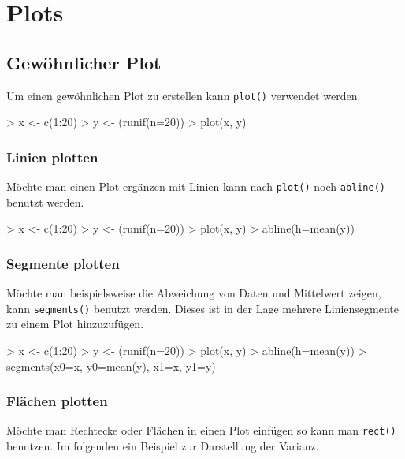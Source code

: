 \section{Plots}

\subsection{Gewöhnlicher Plot}
Um einen gewöhnlichen Plot zu erstellen kann \lstinline{plot()}
verwendet werden. 

\begin{Schunk}
\begin{Sinput}
> x <- c(1:20)
> y <- (runif(n=20))
> plot(x, y)
\end{Sinput}
\end{Schunk}

\subsubsection{Linien plotten}
Möchte man einen Plot ergänzen mit Linien kann nach \lstinline{plot()}
noch \lstinline{abline()} benutzt werden.

\begin{Schunk}
\begin{Sinput}
> x <- c(1:20)
> y <- (runif(n=20))
> plot(x, y)
> abline(h=mean(y))
\end{Sinput}
\end{Schunk}

\subsubsection{Segmente plotten}
Möchte man beispielsweise die Abweichung von Daten und Mittelwert
zeigen, kann \lstinline{segments()} benutzt werden. Dieses ist in der
Lage mehrere Liniensegmente zu einem Plot hinzuzufügen.

\begin{Schunk}
\begin{Sinput}
> x <- c(1:20)
> y <- (runif(n=20))
> plot(x, y)
> abline(h=mean(y))
> segments(x0=x, y0=mean(y), x1=x, y1=y)
\end{Sinput}
\end{Schunk}

\subsubsection{Flächen plotten}
Möchte man Rechtecke oder Flächen in einen Plot einfügen so kann man 
\lstinline{rect()} benutzen. Im folgenden ein Beispiel zur Darstellung
der Varianz.


